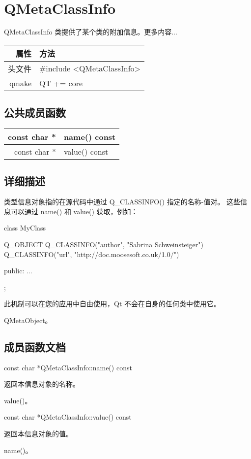 \chapter{QMetaClassInfo}

QMetaClassInfo 类提供了某个类的附加信息。更多内容...

\begin{tabular}{|r|l|}
	\hline
	属性 & 方法 \\
	\hline
	头文件 & \#include <QMetaClassInfo>\\      
	\hline
	qmake & QT += core\\      
	\hline
\end{tabular}

\section{公共成员函数}

\begin{tabular}{|r|l|}   
\hline
const char * 	&name() const \\
\hline
const char * 	& value() const \\ 
\hline
\end{tabular}

\section{详细描述}

类型信息对象指的在源代码中通过 Q\_CLASSINFO() 指定的名称-值对。
这些信息可以通过 name() 和 value() 获取，例如：

\begin{cppcode}
class MyClass
{
    Q_OBJECT
    Q_CLASSINFO("author", "Sabrina Schweinsteiger")
    Q_CLASSINFO("url", "http://doc.moosesoft.co.uk/1.0/")

public:
    ...
};
\end{cppcode}

此机制可以在您的应用中自由使用，Qt 不会在自身的任何类中使用它。

\begin{seeAlso}
QMetaObject。
\end{seeAlso}

\section{成员函数文档}

const char *QMetaClassInfo::name() const

返回本信息对象的名称。

\begin{seeAlso}
value()。
\end{seeAlso}

const char *QMetaClassInfo::value() const

返回本信息对象的值。

\begin{seeAlso}
name()。
\end{seeAlso}